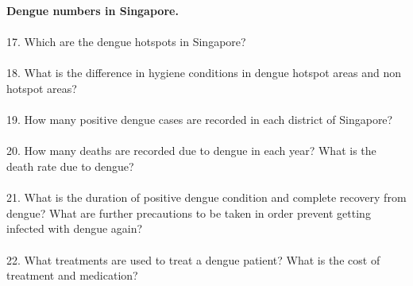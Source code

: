 \documentclass[11pt]{exam}
\begin{document}
\textbf{Dengue numbers in Singapore.} \\ \\
17. Which are the dengue hotspots in Singapore? \\ \\
18. What is the difference in hygiene conditions in dengue hotspot areas and non hotspot 
    areas? \\ \\
19. How many positive dengue cases are recorded in each district of Singapore? \\ \\
20. How many deaths are recorded due to dengue in each year? What is the death rate due to dengue? \\ \\
21. What is the duration of positive dengue condition and complete recovery from dengue? What are further precautions to be taken in order prevent getting infected with dengue again? \\ \\
22. What treatments are used to treat a dengue patient? What is the cost of treatment and 
    medication? \\ \\ \\ \\ \\ \\ \\ \\ \\ \\ \\ \\ \\ \\ \\ \\ \\ \\ \\ \\ \\ \\ 
\end{document}
